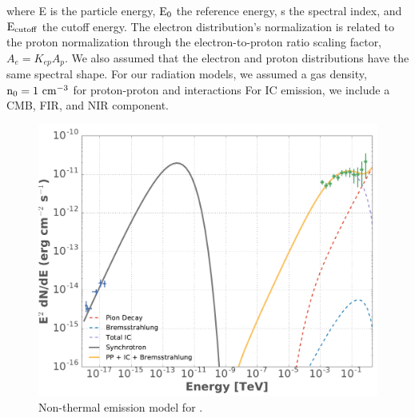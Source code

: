 where E is the particle energy, ${\rm E_0}$ the reference energy, s the spectral index, and ${\rm E_{cutoff}}$ the cutoff energy. The electron distribution's normalization is related to the proton normalization through the electron-to-proton ratio scaling factor, $A_e = K_{ep} A_p$. We also assumed that the electron and proton distributions have the same spectral shape. For our radiation models, we assumed a gas density, ${\rm n_0 = 1~cm^{-3}}$ for proton-proton and \brems{} interactions For IC emission, we include a CMB, FIR, and NIR component. 


%







\begin{figure}[!ht]
	\begin{centering}
		\includegraphics[width=\columnwidth]{Figures/G150/G150_ICsyncBremss_PP_SED.pdf}
		\caption[Non-thermal emission model for \Gone{}]{ Non-thermal emission model for \Gone{}. 
			\label{fig:naimaSED}}
	\end{centering}
\end{figure}

